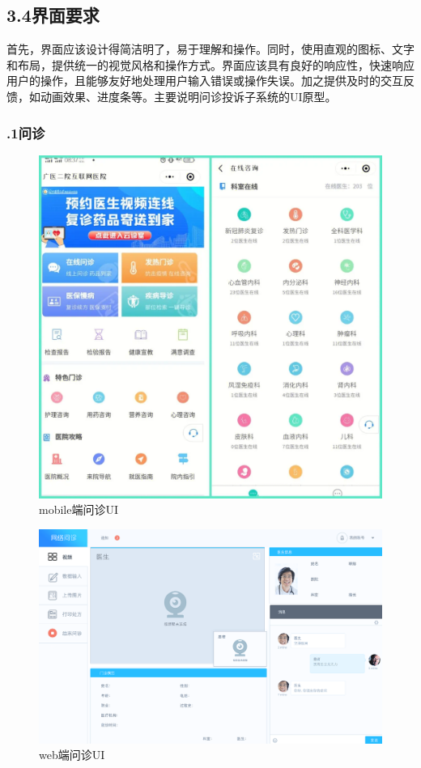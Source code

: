 \documentclass[24pt,a4paper]{article}%
\begin{document}
\subsection*{\songti 3.4界面要求}
首先，界面应该设计得简洁明了，易于理解和操作。同时，使用直观的图标、文字和布局，提供统一的视觉风格和操作方式。界面应该具有良好的响应性，快速响应用户的操作，且能够友好地处理用户输入错误或操作失误。加之提供及时的交互反馈，如动画效果、进度条等。主要说明问诊投诉子系统的UI原型。
\subsubsection*{.1问诊}
\begin{figure}[H]
	\centering
	\includegraphics[width=1\textwidth]{./image/wenzhen-1.png}
	\caption*{mobile端问诊UI}
\end{figure}
\begin{figure}[H]
	\centering
	\includegraphics[width=1\textwidth]{./image/wenzhen-2.png}
	\caption*{web端问诊UI}
\end{figure}
\end{document}
